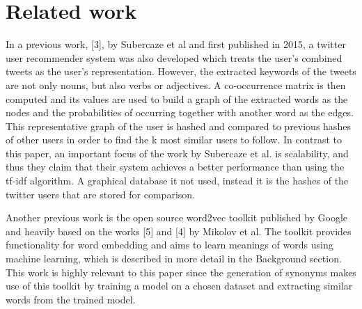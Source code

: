 \section{Related work}
\label{sec:relwork}
In a previous work, [3],  by Subercaze et al and first published in 2015, a twitter user recommender system was also developed which treats the user’s combined tweets as the user’s representation. However, the extracted keywords of the tweets are not only nouns, but also verbs or adjectives. A co-occurrence matrix is then computed and its values are used to build a graph of the extracted words as the nodes and the probabilities of occurring together with another word as the edges. This representative graph of the user is hashed and compared to previous hashes of other users in order to find the k most similar users to follow. In contrast to this paper, an important focus of the work by Subercaze et al. is scalability, and thus they claim that their system achieves a better performance than using the tf-idf algorithm. A graphical database it not used, instead it is the hashes of the twitter users that are stored for comparison.

Another previous work is the open source word2vec toolkit published by Google and heavily based on the works [5] and [4] by Mikolov et al. The toolkit provides functionality for word embedding and aims to learn meanings of words using machine learning, which is described in more detail in the Background section. This work is highly relevant to this paper since the generation of synonyms makes use of this toolkit by training a model on a chosen dataset and extracting similar words from the trained model.



